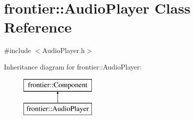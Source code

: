 \hypertarget{classfrontier_1_1_audio_player}{}\section{frontier\+:\+:Audio\+Player Class Reference}
\label{classfrontier_1_1_audio_player}


{\ttfamily \#include $<$Audio\+Player.\+h$>$}

Inheritance diagram for frontier\+:\+:Audio\+Player\+:\begin{figure}[H]
\begin{center}
\leavevmode
\includegraphics[height=2.000000cm]{classfrontier_1_1_audio_player}
\end{center}
\end{figure}
